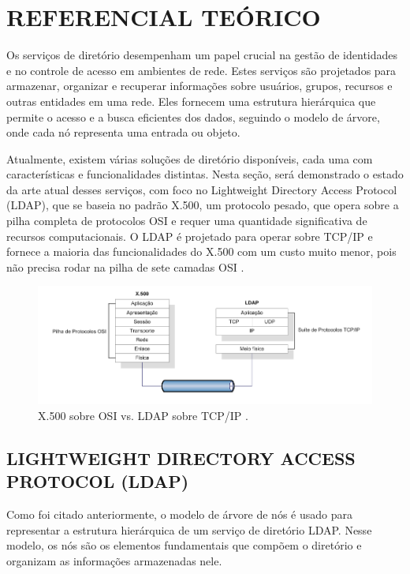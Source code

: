 \newpage

\section{REFERENCIAL TEÓRICO}
\label{sec:referencial-teórico}
Os serviços de diretório desempenham um papel crucial na gestão de identidades e no controle de acesso em ambientes de rede. Estes serviços são projetados para armazenar, organizar e recuperar informações sobre usuários, grupos, recursos e outras entidades em uma rede. Eles fornecem uma estrutura hierárquica que permite o acesso e a busca eficientes dos dados, seguindo o modelo de árvore, onde cada nó representa uma entrada ou objeto.

Atualmente, existem várias soluções de diretório disponíveis, cada uma com características e funcionalidades distintas. Nesta seção, será demonstrado o estado da arte atual desses serviços, com foco no Lightweight Directory Access Protocol (LDAP), que se baseia no padrão X.500, um protocolo pesado, que opera sobre a pilha completa de protocolos OSI e requer uma quantidade significativa de recursos computacionais. O LDAP é projetado para operar sobre TCP/IP e fornece a maioria das funcionalidades do X.500 com um custo muito menor, pois não precisa rodar na pilha de sete camadas OSI \cite{machado2020}.

\begin{figure}[h]
    \centering
	\includegraphics[scale=0.6]{projeto/textuais/CamadasX.500LDAP.png}
	\caption[X.500 sobre OSI vs. LDAP sobre TCP/IP-]{X.500 sobre OSI vs. LDAP sobre TCP/IP \cite{machado2020}.
	\label{fig:camadaX.500Ldap}}
\end{figure}

\subsection{LIGHTWEIGHT DIRECTORY ACCESS PROTOCOL (LDAP)}

Como foi citado anteriormente, o modelo de árvore de nós é usado para representar a estrutura hierárquica de um serviço de diretório LDAP. Nesse modelo, os nós são os elementos fundamentais que compõem o diretório e organizam as informações armazenadas nele.

